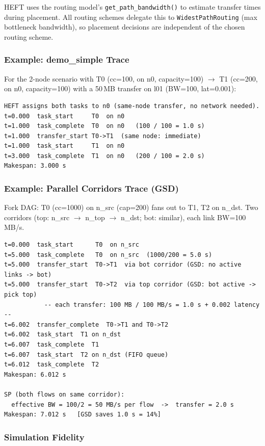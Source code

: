 \documentclass[11pt]{article}
\begin{document}
HEFT uses the routing model's \texttt{get\_path\_bandwidth()} to estimate
transfer times during placement.  All routing schemes delegate this to
\texttt{WidestPathRouting} (max bottleneck bandwidth), so placement decisions
are independent of the chosen routing scheme.

\subsubsection{Example: demo\_simple Trace}

For the 2-node scenario with T0 (cc=100, on n0, capacity=100) $\to$
T1 (cc=200, on n0, capacity=100) with a 50\,MB transfer on l01 (BW=100, lat=0.001):

\begin{lstlisting}
HEFT assigns both tasks to n0 (same-node transfer, no network needed).
t=0.000  task_start     T0  on n0
t=1.000  task_complete  T0  on n0   (100 / 100 = 1.0 s)
t=1.000  transfer_start T0->T1  (same node: immediate)
t=1.000  task_start     T1  on n0
t=3.000  task_complete  T1  on n0   (200 / 100 = 2.0 s)
Makespan: 3.000 s
\end{lstlisting}

\subsubsection{Example: Parallel Corridors Trace (GSD)}

Fork DAG: T0 (cc=1000) on n\_src (cap=200) fans out to T1, T2 on n\_dst.
Two corridors (top: n\_src $\to$ n\_top $\to$ n\_dst; bot: similar),
each link BW=100\,MB/s.

\begin{lstlisting}
t=0.000  task_start      T0  on n_src
t=5.000  task_complete   T0  on n_src  (1000/200 = 5.0 s)
t=5.000  transfer_start  T0->T1  via bot corridor (GSD: no active links -> bot)
t=5.000  transfer_start  T0->T2  via top corridor (GSD: bot active -> pick top)
           -- each transfer: 100 MB / 100 MB/s = 1.0 s + 0.002 latency --
t=6.002  transfer_complete  T0->T1 and T0->T2
t=6.002  task_start  T1 on n_dst
t=6.007  task_complete  T1
t=6.007  task_start  T2 on n_dst (FIFO queue)
t=6.012  task_complete  T2
Makespan: 6.012 s

SP (both flows on same corridor):
  effective BW = 100/2 = 50 MB/s per flow  ->  transfer = 2.0 s
Makespan: 7.012 s   [GSD saves 1.0 s = 14%]
\end{lstlisting}

\subsubsection{Simulation Fidelity}
\end{document}
